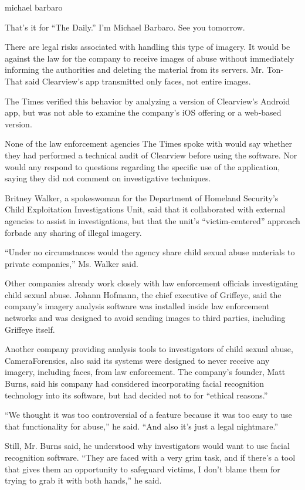 michael barbaro

That's it for ``The Daily.'' I'm Michael Barbaro. See you tomorrow.

There are legal risks associated with handling this type of imagery. It
would be against the law for the company to receive images of abuse
without immediately informing the authorities and deleting the material
from its servers. Mr. Ton-That said Clearview's app transmitted only
faces, not entire images.

The Times verified this behavior by analyzing a version of Clearview's
Android app, but was not able to examine the company's iOS offering or a
web-based version.

None of the law enforcement agencies The Times spoke with would say
whether they had performed a technical audit of Clearview before using
the software. Nor would any respond to questions regarding the specific
use of the application, saying they did not comment on investigative
techniques.

Britney Walker, a spokeswoman for the Department of Homeland Security's
Child Exploitation Investigations Unit, said that it collaborated with
external agencies to assist in investigations, but that the unit's
``victim-centered'' approach forbade any sharing of illegal imagery.

``Under no circumstances would the agency share child sexual abuse
materials to private companies,'' Ms. Walker said.

Other companies already work closely with law enforcement officials
investigating child sexual abuse. Johann Hofmann, the chief executive of
Griffeye, said the company's imagery analysis software was installed
inside law enforcement networks and was designed to avoid sending images
to third parties, including Griffeye itself.

Another company providing analysis tools to investigators of child
sexual abuse, CameraForensics, also said its systems were designed to
never receive any imagery, including faces, from law enforcement. The
company's founder, Matt Burns, said his company had considered
incorporating facial recognition technology into its software, but had
decided not to for ``ethical reasons.''

``We thought it was too controversial of a feature because it was too
easy to use that functionality for abuse,'' he said. ``And also it's
just a legal nightmare.''

Still, Mr. Burns said, he understood why investigators would want to use
facial recognition software. ``They are faced with a very grim task, and
if there's a tool that gives them an opportunity to safeguard victims, I
don't blame them for trying to grab it with both hands,'' he said.

